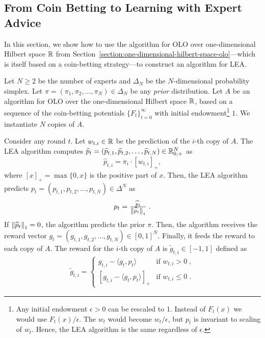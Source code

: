 \subsection{From Coin Betting to Learning with Expert Advice}
\label{section:reduction-experts}

In this section, we show how to use the algorithm for OLO over one-dimensional
Hilbert space $\mathbb{R}$ from
Section~\ref{section:one-dimensional-hilbert-space-olo}---which is itself based
on a coin-betting strategy---to construct an algorithm for \ac{LEA}.

\vspace{-0.05cm}

Let $N \ge 2$ be the number of experts and $\Delta_N$ be the $N$-dimensional
probability simplex. Let $\pi = (\pi_1, \pi_2, \dots, \pi_N) \in \Delta_N$ be
any \emph{prior} distribution. Let $A$ be an algorithm for OLO over
the one-dimensional Hilbert space $\mathbb{R}$, based on a sequence of the coin-betting
potentials $\{F_t\}_{t=0}^\infty$ with initial endowment\footnote{Any initial
endowment $\epsilon > 0$ can be rescaled to $1$. Instead of $F_t(x)$ we would
use $F_t(x)/\epsilon$. The $w_t$ would become $w_t/\epsilon$, but $p_t$ is
invariant to scaling of $w_t$. Hence, the LEA algorithm is the same regardless
of $\epsilon$.} $1$. We instantiate $N$ copies of $A$.

\vspace{-0.05cm}

Consider any round $t$. Let $w_{t,i} \in \mathbb{R}$ be the prediction of the $i$-th copy of
$A$. The LEA algorithm computes $\widehat p_t = (\widehat p_{t,1}, \widehat
p_{t,2}, \dots, \widehat p_{t,N}) \in \mathbb{R}_{0,+}^N$ as
\begin{equation}
\label{eq:phat}
\widehat p_{t,i} = \pi_i \cdot [w_{t,i}]_+,
\end{equation}
where $[x]_+ = \max\{0,x\}$ is the positive part of $x$. Then, the LEA
algorithm predicts $p_t = (p_{t,1}, p_{t,2}, \dots, p_{t,N}) \in \Delta^N$ as
\begin{equation}
\label{eq:preds_experts}
p_t = \tfrac{\widehat p_t}{\left\|{\widehat p_t}\right\|_1} \; .
\end{equation}
If $\left\|{\widehat p_t}\right\|_1 = 0$, the algorithm predicts the prior $\pi$.
Then, the algorithm receives the reward vector
$g_t = (g_{t,1}, g_{t,2}, \dots, g_{t,N}) \in [0,1]^N$. Finally, it
feeds the reward to each copy of $A$. The reward for the $i$-th copy of $A$ is $\widetilde g_{t,i} \in
[-1,1]$ defined as
\begin{align}
\label{eq:gradients_experts_reduction}
\widetilde g_{t,i} =
\begin{cases}
g_{t,i} - \langle g_t, p_t \rangle & \text{if } w_{t,i} > 0 \; , \\
\left[g_{t,i} - \langle g_t, p_t \rangle \right]_+ & \text{if } w_{t,i} \le 0 \; .
\end{cases}
\end{align}

